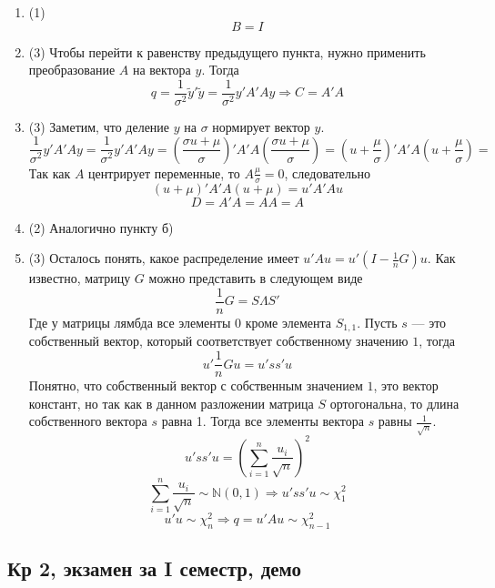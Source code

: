\documentclass[12pt, a4paper]{article}
\begin{document}
\begin{enumerate}
\begin{enumerate}
\item (1)
\[
B = I
\]
\item (3)
Чтобы перейти к равенству предыдущего пункта, нужно применить преобразование $A$ на вектора $y$. Тогда
\[
q = \frac{1}{\sigma^2}\tilde{y}' \tilde{y} =  \frac{1}{\sigma^2}y'A' A y \Rightarrow C = A' A
\]
\item (3)
Заметим, что деление $y$ на $\sigma$ нормирует вектор $y$.
\[
\frac{1}{\sigma^2}y'A' A y = \frac{1}{\sigma^2}y'A' A y = \left( \frac{\sigma u + \mu}{\sigma} \right)' A' A \left( \frac{\sigma u + \mu}{\sigma} \right) = (u + \frac{\mu}{\sigma})'A' A(u + \frac{\mu}{\sigma}) =
\]
Так как $A$ центрирует переменные, то $A\frac{\mu}{\sigma} = 0$, следовательно
\[
 (u + \mu)'A' A(u + \mu) = u'A'Au
\]
\[
D = A'A = AA = A
\]
\item (2)
Аналогично пункту б)
\item (3)
Осталось понять, какое распределение имеет $u'Au = u'(I - \frac{1}{n}G)u$. Как известно, матрицу $G$ можно представить в следующем виде
\[
\frac{1}{n}G = S\Lambda S'
\]
Где у матрицы лямбда все элементы 0 кроме элемента $S_{1,1}$. Пусть $s$ — это собственный вектор, который соответствует собственному значению $1$, тогда
\[
u'\frac{1}{n}Gu = u'ss'u
\]
Понятно, что собственный вектор с собственным значением $1$, это вектор констант, но так как в данном разложении матрица $S$ ортогональна, то длина собственного вектора $s$ равна 1. Тогда все элементы вектора $s$ равны $\frac{1}{\sqrt{n}}$.
\[
 u'ss'u = \left( \sum_{i = 1}^n \frac{u_i}{\sqrt{n}} \right)^2
\]
\[
\sum_{i = 1}^n \frac{u_i}{\sqrt{n}} \sim \mathbb{N} (0,1) \Rightarrow  u'ss'u \sim \chi_{1}^2
\]
\[
u'u \sim \chi_{n}^2 \Rightarrow q = u'Au \sim \chi_{n-1}^2
\]
\end{enumerate}
\end{enumerate}


\subsection{Кр 2, экзамен за I семестр, демо}



\end{document}
